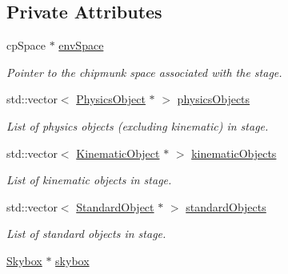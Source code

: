 \subsection*{Private Attributes}
\begin{DoxyCompactItemize}
\item 
cp\+Space $\ast$ \hyperlink{class_stage_a76084dcddff87933d320310c0dd3e0c9}{env\+Space}\hypertarget{class_stage_a76084dcddff87933d320310c0dd3e0c9}{}\label{class_stage_a76084dcddff87933d320310c0dd3e0c9}

\begin{DoxyCompactList}\small\item\em Pointer to the chipmunk space associated with the stage. \end{DoxyCompactList}\item 
std\+::vector$<$ \hyperlink{class_physics_object}{Physics\+Object} $\ast$ $>$ \hyperlink{class_stage_a2eff484024263e8dac366acceaf39d80}{physics\+Objects}\hypertarget{class_stage_a2eff484024263e8dac366acceaf39d80}{}\label{class_stage_a2eff484024263e8dac366acceaf39d80}

\begin{DoxyCompactList}\small\item\em List of physics objects (excluding kinematic) in stage. \end{DoxyCompactList}\item 
std\+::vector$<$ \hyperlink{class_kinematic_object}{Kinematic\+Object} $\ast$ $>$ \hyperlink{class_stage_ae19e1e3837dbfce1b5b56baea357257c}{kinematic\+Objects}\hypertarget{class_stage_ae19e1e3837dbfce1b5b56baea357257c}{}\label{class_stage_ae19e1e3837dbfce1b5b56baea357257c}

\begin{DoxyCompactList}\small\item\em List of kinematic objects in stage. \end{DoxyCompactList}\item 
std\+::vector$<$ \hyperlink{class_standard_object}{Standard\+Object} $\ast$ $>$ \hyperlink{class_stage_a24a06cb21b7049ff40def14328cd9ff7}{standard\+Objects}\hypertarget{class_stage_a24a06cb21b7049ff40def14328cd9ff7}{}\label{class_stage_a24a06cb21b7049ff40def14328cd9ff7}

\begin{DoxyCompactList}\small\item\em List of standard objects in stage. \end{DoxyCompactList}\item 
\hyperlink{class_skybox}{Skybox} $\ast$ \hyperlink{class_stage_a6f4ee2ce2aa9c87d5f97088b7e303fd6}{skybox}\hypertarget{class_stage_a6f4ee2ce2aa9c87d5f97088b7e303fd6}{}\label{class_stage_a6f4ee2ce2aa9c87d5f97088b7e303fd6}


\end{DoxyCompactItemize}
